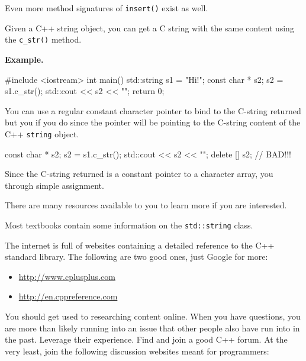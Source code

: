 Even more method signatures of \texttt{insert()} exist as well.

\newpage{}

Given a C++ string object, you can get a C string with the same content
using the \texttt{c_str()} method.

\textbf{Example.}

\begin{console}
#include <iostream>
int main()
{   
    std::string s1 = "Hi!";
    const char * s2;
    s2 = s1.c_str();
    std::cout << s2 << "\n";
    return 0;
}
\end{console}

You can use a regular constant character pointer to bind to the C-string returned but you  if you do since the pointer will be pointing to the C-string content of the C++ \texttt{string} object.

\begin{console}
const char * s2;
s2 = s1.c_str();
std::cout << s2 << "\n";
delete [] s2; // BAD!!!
\end{console}

Since the C-string returned is a constant pointer to a character array,
you  through simple
assignment.


\newpage{}

There are many resources available to you to learn more if you are
interested.

Most textbooks contain some information on the \texttt{std::string} class.

The internet is full of websites containing a detailed reference to the
C++ standard library. The following are two good ones, just Google for
more:

\begin{itemize}
\item
  \href{http://www.cplusplus.com/}{http://www.cplusplus.com}
\item
  \href{http://en.cppreference.com/}{http://en.cppreference.com}
\end{itemize}

You should get used to researching content online. When you have
questions, you are more than likely running into an issue that other
people also have run into in the past. Leverage their experience. Find
and join a good C++ forum. At the very least, join the following
discussion websites meant for programmers:

